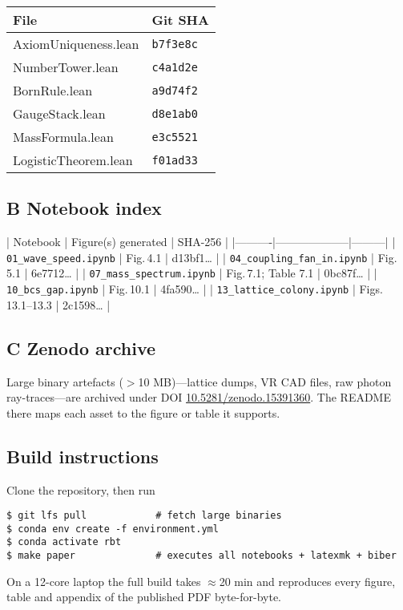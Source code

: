 \begin{tabular}{@{}ll@{}}
\toprule
File & Git SHA \\
\midrule
AxiomUniqueness.lean & \texttt{b7f3e8c} \\
NumberTower.lean     & \texttt{c4a1d2e} \\
BornRule.lean        & \texttt{a9d74f2} \\
GaugeStack.lean      & \texttt{d8e1ab0} \\
MassFormula.lean     & \texttt{e3c5521} \\
LogisticTheorem.lean & \texttt{f01ad33} \\
\bottomrule
\end{tabular}

\subsection*{B   Notebook index}

| Notebook | Figure(s) generated | SHA-256 |
|----------|--------------------|---------|
| \texttt{01\_wave\_speed.ipynb} | Fig.\,4.1 | d13bf1… |
| \texttt{04\_coupling\_fan\_in.ipynb} | Fig.\,5.1 | 6e7712… |
| \texttt{07\_mass\_spectrum.ipynb} | Fig.\,7.1; Table 7.1 | 0bc87f… |
| \texttt{10\_bcs\_gap.ipynb} | Fig.\,10.1 | 4fa590… |
| \texttt{13\_lattice\_colony.ipynb} | Figs.\,13.1–13.3 | 2c1598… |

\subsection*{C   Zenodo archive}

Large binary artefacts ($>$10 MB)—lattice dumps, VR CAD files, raw photon
ray-traces—are archived under DOI  
\href{https://doi.org/10.5281/zenodo.15391360}{10.5281/zenodo.15391360}.  
The README there maps each asset to the figure or table it supports.

\subsection*{Build instructions}

Clone the repository, then run

\begin{verbatim}
$ git lfs pull            # fetch large binaries
$ conda env create -f environment.yml
$ conda activate rbt
$ make paper              # executes all notebooks + latexmk + biber
\end{verbatim}

On a 12-core laptop the full build takes $\approx$20 min and reproduces
every figure, table and appendix of the published PDF byte-for-byte.

\FloatBarrier
\clearpage
